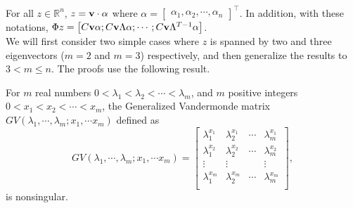 For all $z \in \mathbb{R}^n$, $ z = {\bf v} \cdot \alpha$ where $\alpha = \begin{bmatrix} \alpha_1, \alpha_2, \cdots, \alpha_n \end{bmatrix}^\top $.
In addition, with these notations, $\Phi z = \begin{bmatrix} C {\bf v} \alpha; C {\bf v} \Lambda \alpha; \cdots; C {\bf v} \Lambda^{T-1} \alpha \end{bmatrix}$.
\\
We will first consider two simple cases where $z$ is spanned by two and three eigenvectors ($m = 2$ and $m =3 $) respectively, and then generalize the results to $3 < m \leq n$. The proofs use the following result.
\vspace{-0.35cm}
\begin{lem} \label{lem:gv}
For $m$ real numbers $0< \lambda_1 < \lambda_2 < \cdots < \lambda_m$, and $m$ positive integers $0< x_1 < x_2 < \cdots < x_m$, the Generalized Vandermonde matrix $GV(\lambda_1, \cdots, \lambda_m; x_1, \cdots x_m)$ defined as
\begin{equation}
GV(\lambda_1, \cdots, \lambda_m; x_1, \cdots x_m) = 
	\begin{bmatrix} \lambda_1^{x_1} & \lambda_2^{x_1} & \cdots & \lambda_m^{x_1} \\
			\lambda_1^{x_2} & \lambda_2^{x_2} & \cdots & \lambda_m^{x_2} \\
			\vdots & \vdots  & & \vdots\\
			\lambda_1^{x_m} & \lambda_2^{x_m} & \cdots & \lambda_m^{x_m} \\
	\end{bmatrix},
	\end{equation}\nonumber
is nonsingular.
\end{lem}
 \vspace{-0.4cm}
